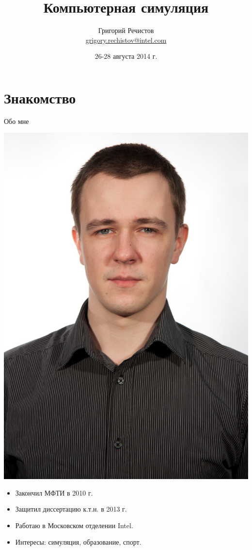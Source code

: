 \documentclass{beamer}
\title{Компьютерная симуляция }
\author[Григорий Речистов]{Григорий Речистов \\ \small{\href{mailto:grigory.rechistov@intel.com}{grigory.rechistov@intel.com}}}
\date{26-28 августа 2014 г.}
\begin{document}
\begin{frame}
\titlepage
\end{frame}

\begin{frame}
\tableofcontents
\end{frame} 

\section{Знакомство}

\begin{frame}{Обо мне}

\raggedleft \includegraphics[height=0.3\textheight]{./grigory-rechistov}

\begin{itemize}
\item Закончил МФТИ в 2010 г.
\item Защитил диссертацию к.т.н. в 2013 г.
\item Работаю в Московском отделении Intel.
\item Интересы: симуляция, образование, спорт.
\end{itemize}
\end{frame} 
\end{document}

